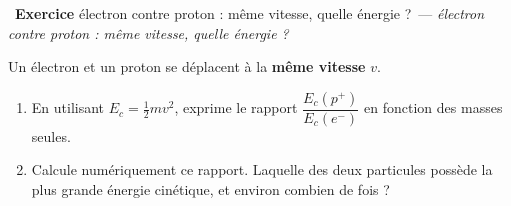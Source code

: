 \documentclass[11pt,a4paper]{article}
\newcommand{\pp}{p^{+}}
\newcommand{\ee}{e^{-}}
\newcounter{exo}
\newcommand{\exo}[1][]{\stepcounter{exo}\par\medskip%
  \noindent{\color{primary}\rule[-2pt]{3.5pt}{15pt}}\ \textbf{\color{primarydark}\large Exercice \theexo}%
  \ifx\relax#1\relax\relax\else\ \textmd{\normalsize\color{black!65}— \itshape #1}\fi\par\nopagebreak\smallskip}
\begin{document}
\exo[électron contre proton : même vitesse, quelle énergie ?]
Un électron et un proton se déplacent à la \textbf{même vitesse} $v$.
\begin{enumerate}[label=\alph*)]
  \item En utilisant $E_c = \tfrac12 m v^2$, exprime le rapport $\dfrac{E_c(\pp)}{E_c(\ee)}$ en fonction
        des masses seules.
  \item Calcule numériquement ce rapport. Laquelle des deux particules possède la plus grande énergie
        cinétique, et environ combien de fois ?
\end{enumerate}
\end{document}
